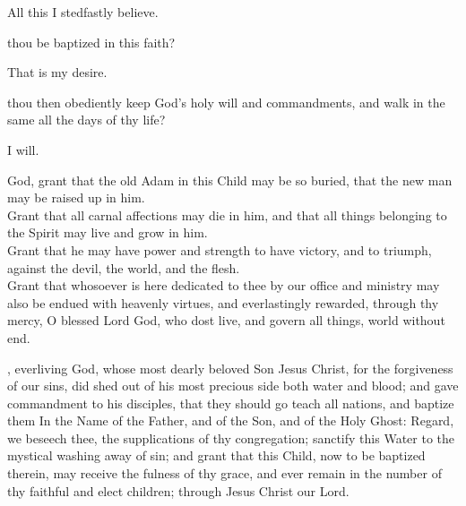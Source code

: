  All this I stedfastly believe.

 thou be baptized in this faith?

 That is my desire.

 thou then obediently keep God's holy will and commandments, and walk in the same all the days of thy life?

 I will.

 God, grant that the old Adam in this Child may be so buried, that the new man may be raised up in him. \\
Grant that all carnal affections may die in him, and that all things belonging to the Spirit may live and grow in him. \\
Grant that he may have power and strength to have victory, and to triumph, against the devil, the world, and the flesh. \\
Grant that whosoever is here dedicated to thee by our office and ministry may also be endued with heavenly virtues, and everlastingly rewarded, through thy mercy, O blessed Lord God, who dost live, and govern all things, world without end. 

, everliving God, whose most dearly beloved Son Jesus Christ, for the forgiveness of our sins, did shed out of his most precious side both water and blood; and gave commandment to his disciples, that they should go teach all nations, and baptize them In the Name of the Father, and of the Son, and of the Holy Ghost: Regard, we beseech thee, the supplications of thy congregation; sanctify this Water to the mystical washing away of sin; and grant that this Child, now to be baptized therein, may receive the fulness of thy grace, and ever remain in the number of thy faithful and elect children; through Jesus Christ our Lord. 


